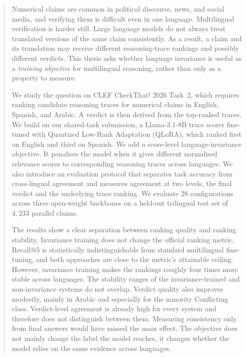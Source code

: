 \documentclass[acmlarge,screen,nonacm]{acmart}
\begin{document}
\begin{abstract}
Numerical claims are common in political discourse, news, and social media, and verifying them is
difficult even in one language. Multilingual verification is harder still. Large language models do
not always treat translated versions of the same claim consistently. As a result, a claim and its
translation may receive different reasoning-trace rankings and possibly different verdicts. This
thesis asks whether language invariance is useful as a \emph{training objective} for multilingual
reasoning, rather than only as a property to measure.

We study the question on CLEF CheckThat! 2026 Task~2, which requires ranking candidate reasoning
traces for numerical claims in English, Spanish, and Arabic. A verdict is then derived from the
top-ranked traces. We build on our shared-task submission, a Llama-3.1-8B trace scorer fine-tuned with
Quantized Low-Rank Adaptation (QLoRA), which ranked first on English and third on Spanish. We add a
score-level language-invariance objective. It penalises the model when it gives different normalised
relevance scores to corresponding reasoning traces across languages. We also introduce an evaluation
protocol that separates task accuracy from cross-lingual agreement and measures agreement at two
levels, the final verdict and the underlying trace ranking. We evaluate $28$ configurations across
three open-weight backbones on a held-out trilingual test set of $4{,}233$ parallel claims.

The results show a clear separation between ranking quality and ranking stability. Invariance training
does not change the official ranking metric, Recall@5 is statistically indistinguishable from standard
multilingual fine-tuning, and both approaches are close to the metric's attainable ceiling. However,
invariance training makes the rankings roughly four times more stable across languages. The stability
ranges of the invariance-trained and non-invariance systems do not overlap. Verdict quality also
improves modestly, mainly in Arabic and especially for the minority \textsf{Conflicting} class.
Verdict-level agreement is already high for every system and therefore does not distinguish between
them. Measuring consistency only from final answers would have missed the main effect. The objective
does not mainly change the label the model reaches, it changes whether the model relies on the same
evidence across languages.
\end{abstract}
\end{document}
